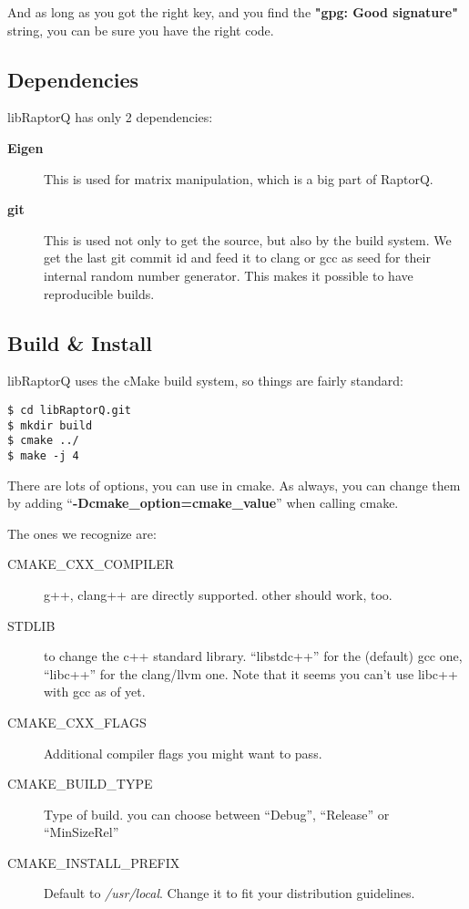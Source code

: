 \documentclass[11pt,a4paper]{refart}
\begin{document}
And as long as you got the right key, and you find the \textbf{"gpg: Good signature"} string,
you can be sure you have the right code.

\subsection{Dependencies}

libRaptorQ has only 2 dependencies:
\begin{description}
\item[\textbf{Eigen}] This is used for matrix manipulation, which is a big part of RaptorQ.
\item[\textbf{git}] This is used not only to get the source, but also by the build system. We get the last git commit id and feed it to clang or gcc as seed for their
internal random number generator. This makes it possible to have reproducible builds.
\end{description}

\subsection{Build \& Install}

libRaptorQ uses the cMake build system, so things are fairly standard:

\begin{verbatim}
$ cd libRaptorQ.git
$ mkdir build
$ cmake ../
$ make -j 4
\end{verbatim}

There are lots of options, you can use in cmake. As always, you can change them by adding ``\textbf{-Dcmake\_option=cmake\_value}'' when calling cmake.

The ones we recognize are:

\begin{description}
\item[CMAKE\_CXX\_COMPILER] g++, clang++ are directly supported. other should work, too.
\item[STDLIB] to change the c++ standard library. ``libstdc++'' for the (default) gcc one, ``libc++'' for the clang/llvm one. Note that it seems you can't use libc++ with gcc as of yet.
\item[CMAKE\_CXX\_FLAGS] Additional compiler flags you might want to pass.
\item[CMAKE\_BUILD\_TYPE] Type of build. you can choose between ``Debug'', ``Release'' or ``MinSizeRel''
\item[CMAKE\_INSTALL\_PREFIX] Default to \textit{/usr/local}. Change it to fit your distribution guidelines.
\end{description}
\end{document}
